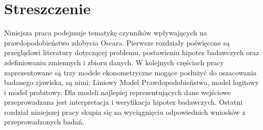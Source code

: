 \chapter*{Streszczenie}

Niniejsza praca podejmuje tematykę czynników wpływających na prawdopodobieństwo zdobycia Oscara. Pierwsze rozdziały poświęcone są przeglądowi literatury dotyczącej problemu, postawieniu hipotez badawczych oraz zdefiniowaniu zmiennych i zbioru danych. W kolejnych częściach pracy zaprezentowane są trzy modele ekonometryczne mogące posłużyć do oszacowania badanego zjawiska, są nimi: Liniowy Model Prawdopodobieństwa, model logitowy i model probitowy. Dla modeli najlepiej reprezentujących dane wejściowe przeprowadzana jest interpretacja i weryfikacja hipotez badawczych. Ostatni rozdział niniejszej pracy skupia się na wyciągnięciu odpowiednich wniosków z przeprowadzonych badań. 